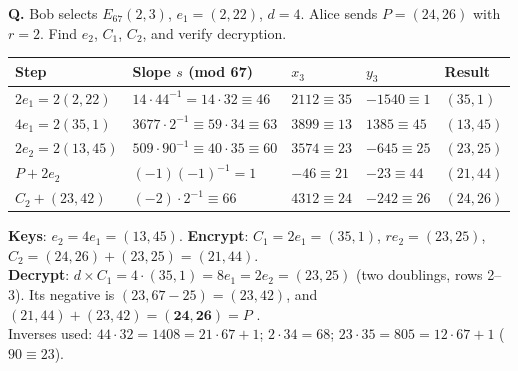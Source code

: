 \begin{worked}
\textbf{Q.} Bob selects $E_{67}(2, 3)$, $e_1 = (2, 22)$, $d = 4$. Alice sends $P = (24, 26)$ with $r = 2$. Find $e_2$, $C_1$, $C_2$, and verify decryption.

\begin{center}\small
\begin{tabular}{@{}lllll@{}}
\toprule
Step & Slope $s$ (mod 67) & $x_3$ & $y_3$ & Result\\
\midrule
$2e_1 = 2(2, 22)$ & $14 \cdot 44^{-1} = 14 \cdot 32 \equiv 46$ & $2112 \equiv 35$ & $-1540 \equiv 1$ & $(35, 1)$\\
$4e_1 = 2(35, 1)$ & $3677 \cdot 2^{-1} \equiv 59 \cdot 34 \equiv 63$ & $3899 \equiv 13$ & $1385 \equiv 45$ & $(13, 45)$\\
$2e_2 = 2(13, 45)$ & $509 \cdot 90^{-1} \equiv 40 \cdot 35 \equiv 60$ & $3574 \equiv 23$ & $-645 \equiv 25$ & $(23, 25)$\\
$P + 2e_2$ & $(-1)(-1)^{-1} = 1$ & $-46 \equiv 21$ & $-23 \equiv 44$ & $(21, 44)$\\
$C_2 + (23, 42)$ & $(-2) \cdot 2^{-1} \equiv 66$ & $4312 \equiv 24$ & $-242 \equiv 26$ & $(24, 26)$\\
\bottomrule
\end{tabular}
\end{center}
\textbf{Keys}: $e_2 = 4 e_1 = (13, 45)$. \textbf{Encrypt}: $C_1 = 2 e_1 = (35, 1)$, $r e_2 = (23, 25)$, $C_2 = (24, 26) + (23, 25) = (21, 44)$.\\
\textbf{Decrypt}: $d \times C_1 = 4 \cdot (35, 1) = 8 e_1 = 2 e_2 = (23, 25)$ (two doublings, rows 2--3). Its negative is $(23, 67 - 25) = (23, 42)$, and $(21, 44) + (23, 42) = \mathbf{(24, 26)} = P$ \checkmark.\\
Inverses used: $44 \cdot 32 = 1408 = 21 \cdot 67 + 1$; $2 \cdot 34 = 68$; $23 \cdot 35 = 805 = 12 \cdot 67 + 1$ ($90 \equiv 23$).
\end{worked}

